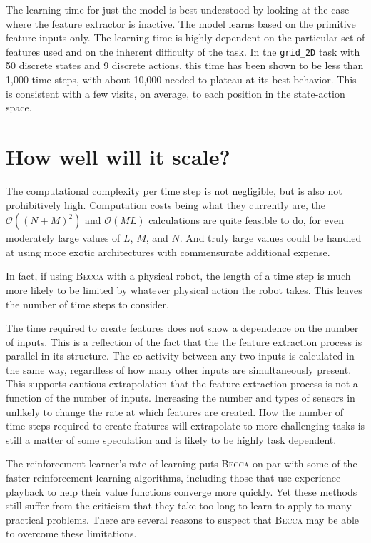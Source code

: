 The learning time for just the model is best understood by looking at the case where the feature extractor is inactive. The model learns based on the primitive feature inputs only. The learning time is highly dependent on the particular set of features used and on the inherent difficulty of the task. In the \texttt{grid\_2D} task with 50 discrete states and 9 discrete actions, this time has been shown to be less than 1,000 time steps, with about 10,000 needed to plateau at its best behavior. This is consistent with a few visits, on average, to each position in the state-action space.

\section{How well will it scale?}

The computational complexity per time step is not negligible, but is also not prohibitively high. Computation costs being what they currently are, the $\mathcal{O}((N+M)^2)$ and  $\mathcal{O}(ML)$ calculations are quite feasible to do, for even moderately large values of $L$, $M$, and $N$. And truly large values could be handled at using more exotic architectures with commensurate additional expense. 

In fact, if using \textsc{Becca} with a physical robot, the length of a time step is much more likely to be limited by whatever physical action the robot takes. This leaves the number of time steps  to consider.

The time required to create features does not show a dependence on the number of inputs. This is a reflection of the fact that the the feature extraction process is parallel in its structure. The co-activity between any two inputs is calculated in the same way, regardless of how many other inputs are simultaneously present. This supports cautious extrapolation that the feature extraction process is not a function of the number of inputs. Increasing the number and types of sensors in unlikely to change the rate at which features are created. How the number of time steps required to create features will extrapolate to more challenging tasks is still a matter of some speculation and is likely to be highly task dependent.

The reinforcement learner's rate of learning puts \textsc{Becca} on par with some of the faster reinforcement learning algorithms, including those that use experience playback to help their value functions converge more quickly. Yet these methods still suffer from the criticism that they take too long to learn to apply to many practical problems. There are several reasons to suspect that \textsc{Becca} may be able to overcome these limitations.


